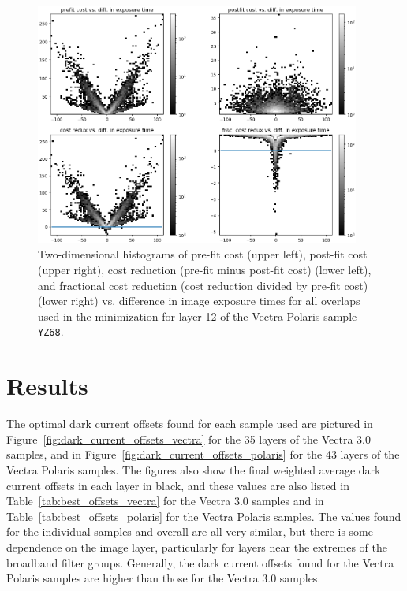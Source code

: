 \documentclass[letterpaper,11pt]{article}
\newcommand{\reffig}[1]{Figure~\ref{#1}}
\newcommand{\reftab}[1]{Table~\ref{#1}}
\begin{document}
\begin{figure}[!ht]
\centering
\includegraphics[width=0.95\textwidth]{images/methods/cost_reduction_plots_2d_YZ68_layer_12}
\caption{\footnotesize Two-dimensional histograms of pre-fit cost (upper left), post-fit cost (upper right), cost reduction (pre-fit minus post-fit cost) (lower left), and fractional cost reduction (cost reduction divided by pre-fit cost) (lower right) vs. difference in image exposure times for all overlaps used in the minimization for layer 12 of the Vectra Polaris sample \texttt{YZ68}.}
\label{fig:cost_reduction_plots_YZ68_layer_12}
\end{figure}

\clearpage

\section{Results}
\label{sec:results}

The optimal dark current offsets found for each sample used are pictured in \reffig{fig:dark_current_offsets_vectra} for the 35 layers of the Vectra 3.0 samples, and in \reffig{fig:dark_current_offsets_polaris} for the 43 layers of the Vectra Polaris samples. The figures also show the final weighted average dark current offsets in each layer in black, and these values are also listed in \reftab{tab:best_offsets_vectra} for the Vectra 3.0 samples and in \reftab{tab:best_offsets_polaris} for the Vectra Polaris samples. The values found for the individual samples and overall are all very similar, but there is some dependence on the image layer, particularly for layers near the extremes of the broadband filter groups. Generally, the dark current offsets found for the Vectra Polaris samples are higher than those for the Vectra 3.0 samples.
\end{document}
